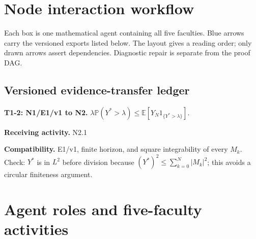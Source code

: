 \documentclass[preprint,12pt,aps,pra,showkeys,amsmath,amssymb,superscriptaddress,floatfix]{revtex4-2}
\theoremstyle{definition}
\theoremstyle{remark}
\newcommand{\field}[2]{\par\smallskip\noindent\textbf{#1.} #2\par}
\begin{document}
\clearpage\section{Node interaction workflow}

\begin{center}\end{center}

Each box is one mathematical agent containing all five faculties. Blue
arrows carry the versioned exports listed below. The layout gives a
reading order; only drawn arrows assert dependencies. Diagnostic repair
is separate from the proof DAG.

\subsection{Versioned evidence-transfer ledger}

\begingroup\small\linespread{1.05}\selectfont

\field{T1-2: N1/E1/v1 to N2}{\(\lambda\mathbb P(Y^*>\lambda)\le\mathbb E[Y_N1_{\{Y^*>\lambda\}}]\).}

\field{Receiving activity}{N2.1}

\field{Compatibility}{E1/v1, finite horizon, and square integrability of every \(M_k\). Check:
\(Y^*\) is in \(L^2\) before division because
\((Y^*)^2\le\sum_{k=0}^N|M_k|^2\); this avoids a circular finiteness
argument.}

\endgroup

\clearpage\section{Agent roles and five-faculty activities}\begingroup\small\linespread{1.05}\selectfont{}
\end{document}
